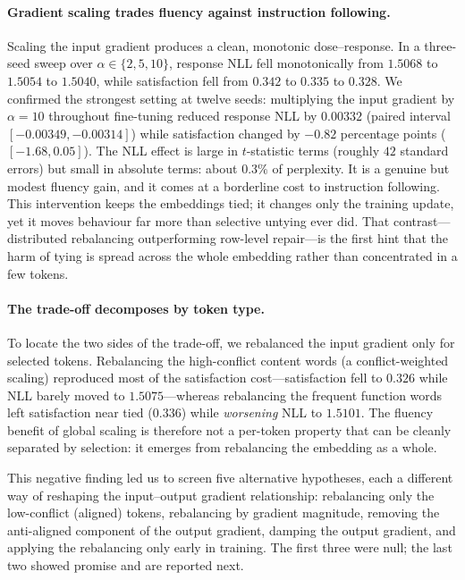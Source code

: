 \documentclass[conference]{IEEEtran}
\begin{document}
\paragraph{Gradient scaling trades fluency against instruction following.}
Scaling the input gradient produces a clean, monotonic dose--response. In a
three-seed sweep over $\alpha\in\{2,5,10\}$, response NLL fell monotonically
from $1.5068$ to $1.5054$ to $1.5040$, while satisfaction fell from $0.342$ to
$0.335$ to $0.328$. We confirmed the strongest setting at twelve seeds:
multiplying the input gradient by $\alpha=10$ throughout fine-tuning reduced
response NLL by $0.00332$ (paired interval
$[-0.00349,-0.00314]$) while satisfaction changed by $-0.82$ percentage points
($[-1.68,0.05]$). The NLL effect is large in $t$-statistic terms (roughly $42$
standard errors) but small in absolute terms: about $0.3\%$ of perplexity. It is
a genuine but modest fluency gain, and it comes at a borderline cost to
instruction following. This intervention keeps the embeddings tied; it changes
only the training update, yet it moves behaviour far more than selective untying
ever did. That contrast---distributed rebalancing outperforming row-level
repair---is the first hint that the harm of tying is spread across the whole
embedding rather than concentrated in a few tokens.

\paragraph{The trade-off decomposes by token type.}
To locate the two sides of the trade-off, we rebalanced the input gradient only
for selected tokens. Rebalancing the high-conflict content words (a
conflict-weighted scaling) reproduced most of the satisfaction cost---satisfaction
fell to $0.326$ while NLL barely moved to $1.5075$---whereas rebalancing the
frequent function words left satisfaction near tied ($0.336$) while
\emph{worsening} NLL to $1.5101$. The fluency benefit of global scaling is
therefore not a per-token property that can be cleanly separated by selection:
it emerges from rebalancing the embedding as a whole.

This negative finding led us to screen five alternative hypotheses, each a
different way of reshaping the input--output gradient relationship: rebalancing
only the low-conflict (aligned) tokens, rebalancing by gradient magnitude,
removing the anti-aligned component of the output gradient, damping the output
gradient, and applying the rebalancing only early in training. The first three
were null; the last two showed promise and are reported next.
\end{document}
